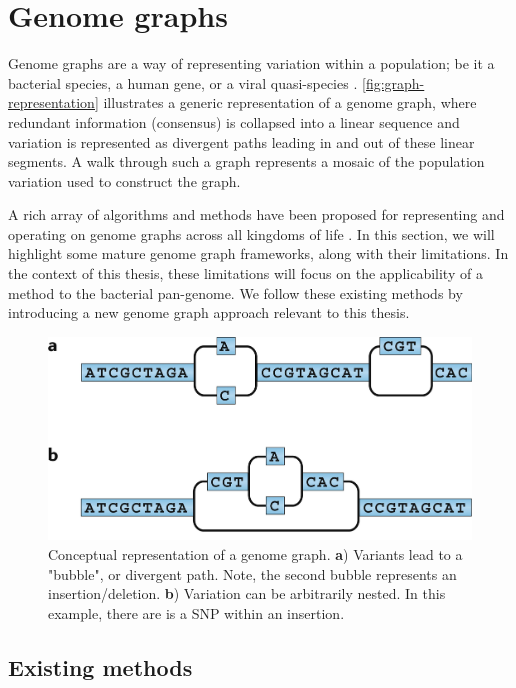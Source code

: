 \section{Genome graphs}

Genome graphs are a way of representing variation within a population; be it a bacterial species, a human gene, or a viral quasi-species \cite{comp-pan-genomics}. \autoref{fig:graph-representation} illustrates a generic representation of a genome graph, where redundant information (consensus) is collapsed into a linear sequence and variation is represented as divergent paths leading in and out of these linear segments. A walk through such a graph represents a mosaic of the population variation used to construct the graph. 

A rich array of algorithms and methods have been proposed for representing and operating on genome graphs across all kingdoms of life \cite{Sherman2020,Eizenga2020,comp-pan-genomics}. In this section, we will highlight some mature genome graph frameworks, along with their limitations. In the context of this thesis, these limitations will focus on the applicability of a method to the bacterial pan-genome. We follow these existing methods by introducing a new genome graph approach relevant to this thesis.

\begin{figure}
\centering
\includegraphics[width=0.75\columnwidth]{Chapter0/Figs/graph-representation.png}
\caption{Conceptual representation of a genome graph. \textbf{a}) Variants lead to a "bubble", or divergent path. Note, the second bubble represents an insertion/deletion. \textbf{b}) Variation can be arbitrarily nested. In this example, there are is a SNP within an insertion.}
\label{fig:graph-representation}
\end{figure}

\subsection{Existing methods}
\label{sec:graphs-existing}

